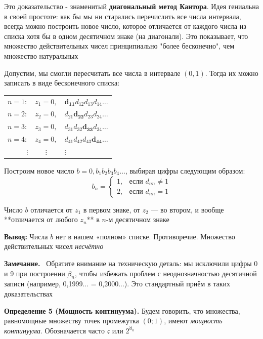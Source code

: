 \documentclass[a4paper,12pt]{article}
\newcommand{\myremark}{\textbf{Замечание.}\ }
\theoremstyle{definition}
\theoremstyle{plain}
\theoremstyle{remark}
\begin{document}
	
	\begin{tcolorbox}[colback=red!5, colframe=red!70!black, title={Теорема Кантора (Диагональный метод)}]
	Это доказательство - знаменитый \textbf{диагональный метод Кантора}. Идея гениальна в своей простоте: как бы мы ни старались перечислить все числа интервала, всегда можно построить новое число, которое отличается от каждого числа из списка хотя бы в одном десятичном знаке (на диагонали). Это показывает, что множество действительных чисел принципиально "более бесконечно", чем множество натуральных
	
	\medskip
	Допустим, мы смогли пересчитать все числа в интервале $(0, 1)$. Тогда их можно записать в виде бесконечного списка:
	
	\begin{center}
	\begin{tabular}{r c l}
	$n=1:$ & $z_1 = 0,$ & $\mathbf{d_{11}} d_{12} d_{13} d_{14} \dots$ \\
	$n=2:$ & $z_2 = 0,$ & $d_{21} \mathbf{d_{22}} d_{23} d_{24} \dots$ \\
	$n=3:$ & $z_3 = 0,$ & $d_{31} d_{32} \mathbf{d_{33}} d_{34} \dots$ \\
	$n=4:$ & $z_4 = 0,$ & $d_{41} d_{42} d_{43} \mathbf{d_{44}} \dots$ \\
	$\vdots$ & $\vdots$ & $\vdots$
	\end{tabular}
	\end{center}
	
	Построим новое число $b = 0, b_1 b_2 b_3 b_4 \dots$, выбирая цифры следующим образом:
	\[
	b_n = \begin{cases} 
	1, & \text{если } d_{nn} \neq 1 \\
	2, & \text{если } d_{nn} = 1 
	\end{cases}
	\]
	
	Число $b$ отличается от $z_1$ в первом знаке, от $z_2$ — во втором, и вообще **отличается от любого $z_n$** в $n$-м десятичном знаке 
	
	\medskip
	\textbf{Вывод:} Числа $b$ нет в нашем «полном» списке. Противоречие. Множество действительных чисел \textit{несчётно}
	\end{tcolorbox}
	
	\bigskip
	\myremark
	Обратите внимание на техническую деталь: мы исключили цифры 0 и 9 при построении $\beta_n$, чтобы избежать проблем с неоднозначностью десятичной записи (например, 0,1999... = 0,2000...). Это стандартный приём в таких доказательствах
	\bigskip
	
	\noindent \textbf{Определение 5 (Мощность континуума).}
	Будем говорить, что множества, равномощные множеству точек промежутка $(0; 1)$, имеют \textit{мощность континуума}. Обозначается часто $\mathfrak{c}$ или $2^{\aleph_0}$
\end{document}
